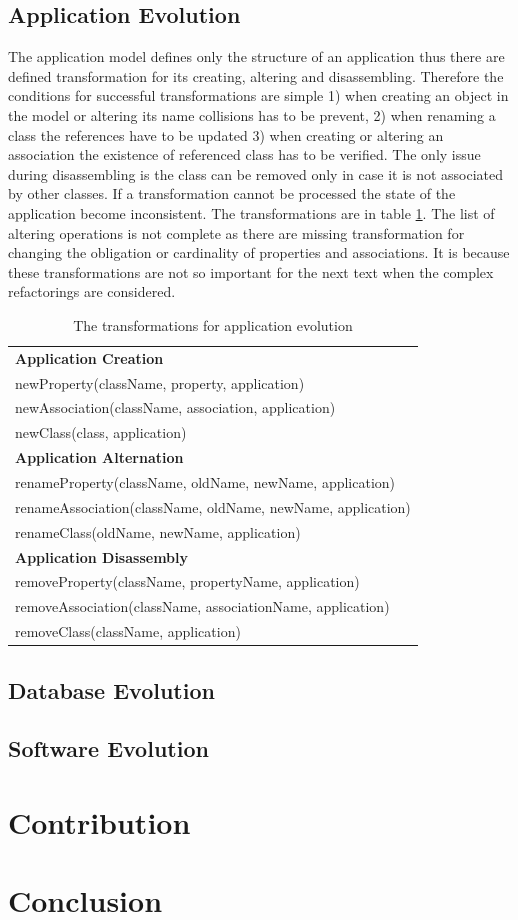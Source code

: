 \documentclass[11pt]{article}
\begin{document}
\subsection{Application Evolution}
\label{sec:app-evolution}
The application model defines only the structure of an application thus there are defined transformation for its creating, altering and disassembling. Therefore the conditions for successful transformations are simple 1) when creating an object in the model or altering its name collisions has to be prevent, 2) when renaming a class the references have to be updated 3) when creating or altering an association the existence of referenced class has to be verified. The only issue during disassembling is the class can be removed only in case it is not associated by other classes. If a transformation cannot be processed the state of the application become inconsistent. The transformations are in table \ref{tab:app-evolution}. The list of altering operations is not complete as there are missing transformation for changing the obligation or cardinality of properties and associations. It is because these transformations are not so important for the next text when the complex refactorings are considered. 
\begin{table}
\centering
	\begin{tabular}{|l|}
	\hline
	\textbf{Application Creation} \\
	newProperty(className, property, application) \\
	newAssociation(className, association, application) \\
	newClass(class, application) \\
	\textbf{Application Alternation} \\
	renameProperty(className, oldName, newName, application) \\
	renameAssociation(className, oldName, newName, application) \\
	renameClass(oldName, newName, application)\\
	\textbf{Application Disassembly} \\
	removeProperty(className, propertyName, application) \\
	removeAssociation(className, associationName, application) \\
	removeClass(className, application)\\
	\hline
	\end{tabular}
	\caption{The transformations for application evolution}
	\label{tab:app-evolution}
\end{table}

\subsection{Database Evolution}
\label{sec:db-evolution}



\subsection{Software Evolution}
\label{sec:sw-evolution}

\section{Contribution}
\label{sec:contribution}

\section{Conclusion}
\end{document}
